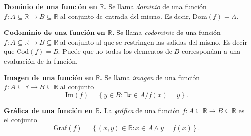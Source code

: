\begin{definition}\textbf{Dominio de una función en $\mathbb{R}$.}
    Se llama \textit{dominio} de una función \newline$f: A \subseteq \mathbb{R} \rightarrow B \subseteq \mathbb{R}$
    al conjunto de entrada del mismo. Es decir, $\text{Dom}(f)=A$.
\end{definition}
\begin{definition}\textbf{Codominio de una función en $\mathbb{R}$.}
    Se llama \textit{codominio} de una función \newline $f: A \subseteq \mathbb{R} \rightarrow B \subseteq \mathbb{R}$
    al conjunto al que se restringen las salidas del mismo. Es decir que $\text{Cod}(f)=B$.
    Puede que no todos los elementos de $B$ correspondan a una evaluación de la función.
\end{definition}
\begin{definition}\textbf{Imagen de una función en $\mathbb{R}$.}
    Se llama \textit{imagen} de una función \newline $f: A \subseteq \mathbb{R} \rightarrow B \subseteq \mathbb{R}$ 
    al conjunto 
    \begin{equation*}
        \text{Im}(f) = \left\{ y\in B: \exists x\in A / f(x)=y \right\}.    
    \end{equation*}
\end{definition}
\begin{definition}\textbf{Gráfica de una función en $\mathbb{R}$.}
    La \textit{gráfica} de una función $f: A \subseteq \mathbb{R} \rightarrow B \subseteq \mathbb{R}$ es
    el conjunto
    \begin{equation*}
        \text{Graf}(f) = \left\{ (x,y)\in \mathbb{R}: x \in A \land y=f(x)\right\}.    
    \end{equation*}
\end{definition}

